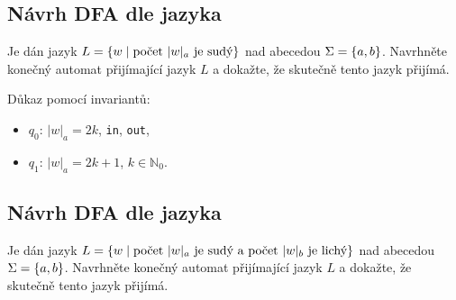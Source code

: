 \subsection{Návrh DFA dle jazyka}

Je dán jazyk $L = \left\lbrace w \mid \text{počet } |w|_a \text{ je sudý} \right\rbrace$ nad abecedou $\Sigma = \left\lbrace a,b \right\rbrace$. Navrhněte konečný
automat přijímající jazyk $L$ a dokažte, že skutečně tento jazyk přijímá.

\begin{multicols}{2}

    Důkaz pomocí invariantů:
    \begin{itemize}[noitemsep]
        \item $q_0$: $|w|_a = 2k$, \texttt{in}, \texttt{out},
        \item $q_1$: $|w|_a = 2k + 1$, $k \in \mathbb{N}_0$.
    \end{itemize}
\end{multicols}

\subsection{Návrh DFA dle jazyka}
Je dán jazyk $L = \left\lbrace w \mid \text{počet } |w|_a \text{ je sudý a počet } |w|_b \text{ je lichý} \right\rbrace$ nad abecedou
$\Sigma = \left\lbrace a,b \right\rbrace$. Navrhněte konečný automat přijímající jazyk $L$ a dokažte, že skutečně tento jazyk přijímá.

